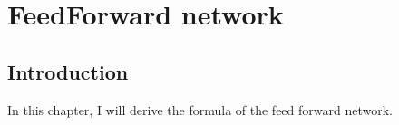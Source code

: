\chapter{FeedForward network}

\section{Introduction}

In this chapter, I will derive the formula of the feed forward network.

